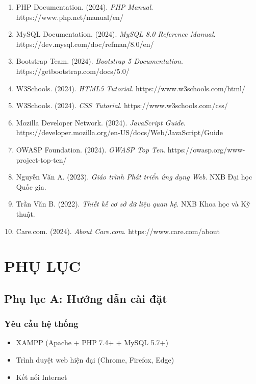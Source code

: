 \documentclass[13pt,a4paper]{extreport}
\begin{document}
\begin{enumerate}
    \item PHP Documentation. (2024). \textit{PHP Manual}. https://www.php.net/manual/en/
    
    \item MySQL Documentation. (2024). \textit{MySQL 8.0 Reference Manual}. https://dev.mysql.com/doc/refman/8.0/en/
    
    \item Bootstrap Team. (2024). \textit{Bootstrap 5 Documentation}. https://getbootstrap.com/docs/5.0/
    
    \item W3Schools. (2024). \textit{HTML5 Tutorial}. https://www.w3schools.com/html/
    
    \item W3Schools. (2024). \textit{CSS Tutorial}. https://www.w3schools.com/css/
    
    \item Mozilla Developer Network. (2024). \textit{JavaScript Guide}. https://developer.mozilla.org/en-US/docs/Web/JavaScript/Guide
    
    \item OWASP Foundation. (2024). \textit{OWASP Top Ten}. https://owasp.org/www-project-top-ten/
    
    \item Nguyễn Văn A. (2023). \textit{Giáo trình Phát triển ứng dụng Web}. NXB Đại học Quốc gia.
    
    \item Trần Văn B. (2022). \textit{Thiết kế cơ sở dữ liệu quan hệ}. NXB Khoa học và Kỹ thuật.
    
    \item Care.com. (2024). \textit{About Care.com}. https://www.care.com/about
\end{enumerate}

\newpage

\chapter*{PHỤ LỤC}

\section*{Phụ lục A: Hướng dẫn cài đặt}

\subsection*{Yêu cầu hệ thống}
\begin{itemize}
    \item XAMPP (Apache + PHP 7.4+ + MySQL 5.7+)
    \item Trình duyệt web hiện đại (Chrome, Firefox, Edge)
    \item Kết nối Internet
\end{itemize}
\end{document}
